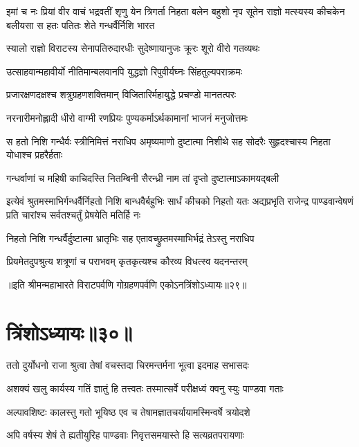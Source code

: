 \onelineshloka
{इमां च नः प्रियां वीर वाचं भद्रवतीं शृणु}
\threelineshloka
{येन त्रिगर्ता निहता बलेन बहुशो नृप}
{सूतेन राज्ञो मत्स्यस्य कीचकेन बलीयसा}
{स हतः पतितः शेते गन्धर्वैर्निशि भारत}


\twolineshloka
{स्यालो राज्ञो विराटस्य सेनापतिरुदारधीः}
{सुदेष्णायानुजः क्रूरः शूरो वीरो गतव्यथः}


\twolineshloka
{उत्साहवान्महावीर्यो नीतिमान्बलवानपि}
{युद्धज्ञो रिपुवीर्यघ्नः सिंहतुल्यपराक्रमः}


\twolineshloka
{प्रजारक्षणदक्षश्च शत्रुग्रहणशक्तिमान्}
{विजितारिर्महायुद्धे प्रचण्डो मानतत्परः}


\twolineshloka
{नरनारीमनोह्लादी धीरो वाग्मी रणप्रियः}
{पुण्यकर्माऽर्थकामानां भाजनं मनुजोत्तमः}


\threelineshloka
{स हतो निशि गन्धैर्वः स्त्रीनिमित्तं नराधिप}
{अमृष्यमाणो दुष्टात्मा निशीथे सह सोदरैः}
{सुहृदश्चास्य निहता योधाश्च प्रहरैर्हताः}


\twolineshloka
{गन्धर्वाणां च महिषी काचिदस्ति नितम्बिनी}
{सैरन्ध्री नाम तां दृप्तो दुष्टात्माऽकामयद्बली}


\onelineshloka
{इत्येवं श्रुतमस्माभिर्गन्धर्वैर्निहतो निशि}
\threelineshloka
{बान्धवैर्बहुभिः सार्धं कीचको निहतो यतः}
{अद्यप्रभृति राजेन्द्र पाण्डवान्वेषणं प्रति}
{चारांश्च सर्वतश्चर्तुं प्रेषयेति मतिर्हि नः}


\twolineshloka
{निहतो निशि गन्धर्वैर्दुष्टात्मा भ्रातृभिः सह}
{एतावच्छ्रुतमस्माभिर्भद्रं तेऽस्तु नराधिप}


\twolineshloka
{प्रियमेतदुपश्रुत्य शत्रूणां च पराभवम्}
{कृतकृत्यश्च कौरव्य विधत्स्व यदनन्तरम्}

॥इति श्रीमन्महाभारते विराटपर्वणि गोग्रहणपर्वणि एकोऽनत्रिंशोऽध्यायः॥२९॥

\chapter{त्रिंशोऽध्यायः॥३०॥}

\twolineshloka
{ततो दुर्योधनो राजा श्रुत्वा तेषां वचस्तदा}
{चिरमन्तर्मना भूत्वा इदमाह सभासदः}


\twolineshloka
{अशक्यं खलु कार्यस्य गतिं ज्ञातुं हि तत्त्वतः}
{तस्मात्सर्वे परीक्षध्वं क्वनु स्युः पाण्डवा गताः}


\twolineshloka
{अल्पावशिष्टः कालस्तु गतो भूयिष्ठ एव च}
{तेषामज्ञातचर्यायामस्मिन्वर्षे त्रयोदशे}


\twolineshloka
{अपि वर्षस्य शेषं ते ह्यतीयुरिह पाण्डवाः}
{निवृत्तसमयास्ते हि सत्यव्रतपरायणाः}


